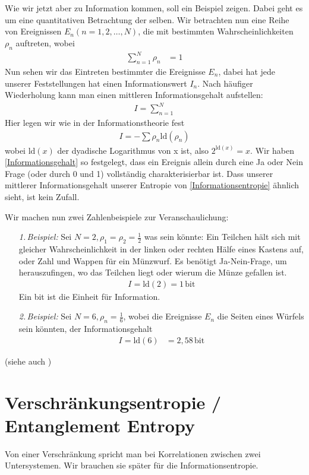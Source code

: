 \documentclass[ngerman]{scrartcl}
\begin{document}
Wie wir jetzt aber zu Information kommen, soll ein Beispiel zeigen. Dabei geht es um eine quantitativen Betrachtung der selben.
Wir betrachten nun eine Reihe von Ereignissen $E_n (n = 1, 2, \ldots, N)$, die mit bestimmten Wahrscheinlichkeiten $\rho_n$ auftreten, wobei
	\begin{align}
		\sum_{n=1}^N \rho_n &= 1
	\end{align}
Nun sehen wir das Eintreten bestimmter die Ereignisse $E_n$, dabei hat jede unserer Feststellungen hat einen Informationswert $I_n$. Nach häufiger Wiederholung kann man einen mittleren Informationsgehalt aufstellen:
	\begin{align}
		I = \sum_{n=1}^N
	\end{align}
Hier legen wir wie in der Informationstheorie fest
	\begin{align} \label{Informationsgehalt}
		I = - \sum \rho_n \mathrm{ld}(\rho_n)
	\end{align}
wobei $\mathrm{ld}(x)$ der dyadische Logarithmus von x ist, also $2^{\mathrm{ld}(x)} = x$. 
Wir haben \eqref{Informationsgehalt} so festgelegt, dass ein Ereignis allein durch eine Ja oder Nein Frage (oder durch 0 und 1) vollständig charakterisierbar ist. 
Dass unserer mittlerer Informationsgehalt unserer Entropie von \eqref{Informationsentropie} ähnlich sieht, ist kein Zufall.

Wir machen nun zwei Zahlenbeispiele zur Veranschaulichung:
	\begin{itemize}
		\item[\textit{1.\,Beispiel:}] Sei $N=2, \rho_1 = \rho_2= \frac{1}{2}$ was sein könnte: Ein Teilchen hält sich mit gleicher Wahrscheinlichkeit in der linken oder rechten Hälfe eines Kastens auf, oder Zahl und Wappen für ein Münzwurf.
		Es benötigt Ja-Nein-Frage, um herauszufingen, wo das Teilchen liegt oder wierum die Münze gefallen ist.
			\begin{align}
				I = \mathrm{ld}(2) = 1 \,\mathrm{bit}
			\end{align}
		Ein bit ist die Einheit für Information.
		\item[\textit{2.\,Beispiel:}]Sei $N=6, \rho_n = \frac{1}{6}$, wobei die Ereignisse $E_n$ die Seiten eines Würfels sein könnten, der Informationsgehalt
			\begin{align}
				I = \mathrm{ld}(6) &= 2,58 \,\mathrm{bit}
			\end{align}
	\end{itemize}
(siehe auch \cite{Brenig})
\section{Verschränkungsentropie / Entanglement Entropy} %
	Von einer Verschränkung spricht man bei Korrelationen zwischen zwei Untersystemen. Wir brauchen sie später für die Informationsentropie.
		
\end{document}
